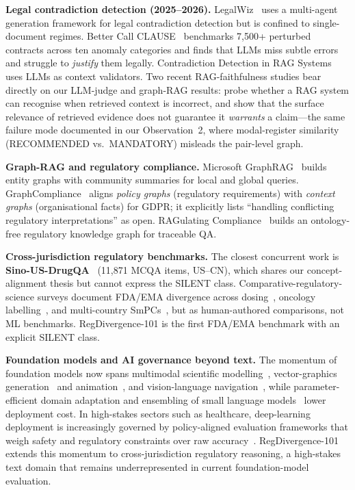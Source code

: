\documentclass[manuscript]{acmart}
\begin{document}
\textbf{Legal contradiction detection (2025--2026).}
LegalWiz~\cite{legalwiz2025} uses a multi-agent generation framework for legal
contradiction detection but is confined to single-document regimes. Better Call
CLAUSE~\cite{betterclause2026} benchmarks 7,500+
perturbed contracts across ten anomaly categories and finds that LLMs miss
subtle errors and struggle to \textit{justify} them legally. Contradiction
Detection in RAG Systems~\cite{contradictionrag2025} uses LLMs as context
validators. Two recent RAG-faithfulness studies bear directly on our LLM-judge
and graph-RAG results: \citet{chen2026ragwrong} probe whether a RAG system can
recognise when retrieved context is incorrect, and \citet{qian2026evidenceforce}
show that the surface relevance of retrieved evidence does not guarantee it
\textit{warrants} a claim---the same failure mode documented in our Observation~2, where
modal-register similarity (RECOMMENDED vs.\ MANDATORY) misleads the pair-level
graph.

\textbf{Graph-RAG and regulatory compliance.}
Microsoft GraphRAG~\cite{edge2024graphrag} builds entity graphs with community
summaries for local and global queries. GraphCompliance~\cite{graphcompliance2025}
aligns \textit{policy graphs} (regulatory requirements) with \textit{context
graphs} (organisational facts) for GDPR; it explicitly lists ``handling
conflicting regulatory interpretations'' as open. RAGulating
Compliance~\cite{ragulating2025} builds an ontology-free regulatory knowledge
graph for traceable QA.

\textbf{Cross-jurisdiction regulatory benchmarks.}
The closest concurrent work is \textbf{Sino-US-DrugQA}~\cite{sinousdrugqa2026}
(11{,}871 MCQA items, US--CN), which shares our concept-alignment thesis but
cannot express the SILENT class. Comparative-regulatory-science surveys document
FDA/EMA divergence across dosing~\cite{mita2026doses}, oncology
labelling~\cite{gomezfernandez2026inhibitors}, and multi-country
SmPCs~\cite{pvverse2026}, but as human-authored comparisons, not ML benchmarks.
RegDivergence-101 is the first FDA/EMA benchmark with an explicit SILENT class.

\begin{revblock}
\textbf{Foundation models and AI governance beyond text.} The momentum of
foundation models now spans multimodal scientific modelling~\cite{11541222},
vector-graphics generation~\cite{liang2026render} and animation~\cite{liang2026vanim},
and vision-language navigation~\cite{zeng2025janusvln}, while parameter-efficient
domain adaptation and ensembling of small language models~\cite{codes2026} lower
deployment cost. In high-stakes sectors such as healthcare, deep-learning
deployment is increasingly governed by policy-aligned evaluation frameworks that
weigh safety and regulatory constraints over raw accuracy~\cite{chen2026dlsg}.
RegDivergence-101 extends this momentum to cross-jurisdiction regulatory
reasoning, a high-stakes text domain that remains underrepresented in current
foundation-model evaluation.

\end{revblock}
\end{document}
